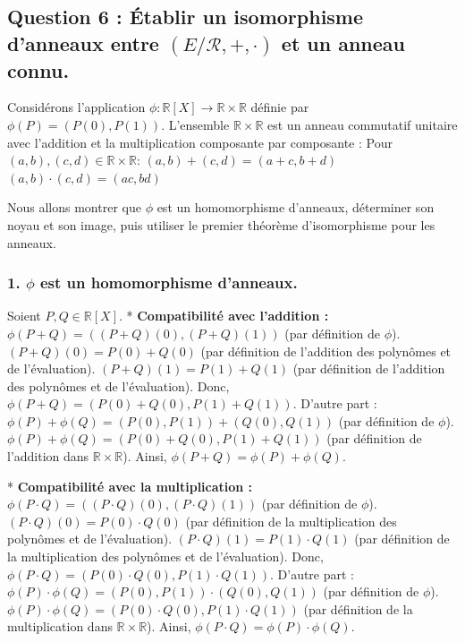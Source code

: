 \documentclass{report}
\begin{document}
\subsection*{Question 6 : Établir un isomorphisme d'anneaux entre $(E/\mathcal{R}, +, \cdot)$ et un anneau connu.}

Considérons l'application $\phi: \mathbb{R}[X] \to \mathbb{R} \times \mathbb{R}$ définie par $\phi(P) = (P(0), P(1))$.
L'ensemble $\mathbb{R} \times \mathbb{R}$ est un anneau commutatif unitaire avec l'addition et la multiplication composante par composante :
Pour $(a,b), (c,d) \in \mathbb{R} \times \mathbb{R}$:
$(a,b) + (c,d) = (a+c, b+d)$
$(a,b) \cdot (c,d) = (ac, bd)$

Nous allons montrer que $\phi$ est un homomorphisme d'anneaux, déterminer son noyau et son image, puis utiliser le premier théorème d'isomorphisme pour les anneaux.

\subsubsection*{1. $\phi$ est un homomorphisme d'anneaux.}
Soient $P, Q \in \mathbb{R}[X]$.
*   \textbf{Compatibilité avec l'addition :}
    $\phi(P+Q) = ((P+Q)(0), (P+Q)(1))$ (par définition de $\phi$).
    $(P+Q)(0) = P(0) + Q(0)$ (par définition de l'addition des polynômes et de l'évaluation).
    $(P+Q)(1) = P(1) + Q(1)$ (par définition de l'addition des polynômes et de l'évaluation).
    Donc, $\phi(P+Q) = (P(0)+Q(0), P(1)+Q(1))$.
    D'autre part :
    $\phi(P) + \phi(Q) = (P(0), P(1)) + (Q(0), Q(1))$ (par définition de $\phi$).
    $\phi(P) + \phi(Q) = (P(0)+Q(0), P(1)+Q(1))$ (par définition de l'addition dans $\mathbb{R} \times \mathbb{R}$).
    Ainsi, $\phi(P+Q) = \phi(P) + \phi(Q)$.

*   \textbf{Compatibilité avec la multiplication :}
    $\phi(P \cdot Q) = ((P \cdot Q)(0), (P \cdot Q)(1))$ (par définition de $\phi$).
    $(P \cdot Q)(0) = P(0) \cdot Q(0)$ (par définition de la multiplication des polynômes et de l'évaluation).
    $(P \cdot Q)(1) = P(1) \cdot Q(1)$ (par définition de la multiplication des polynômes et de l'évaluation).
    Donc, $\phi(P \cdot Q) = (P(0) \cdot Q(0), P(1) \cdot Q(1))$.
    D'autre part :
    $\phi(P) \cdot \phi(Q) = (P(0), P(1)) \cdot (Q(0), Q(1))$ (par définition de $\phi$).
    $\phi(P) \cdot \phi(Q) = (P(0) \cdot Q(0), P(1) \cdot Q(1))$ (par définition de la multiplication dans $\mathbb{R} \times \mathbb{R}$).
    Ainsi, $\phi(P \cdot Q) = \phi(P) \cdot \phi(Q)$.
\end{document}
